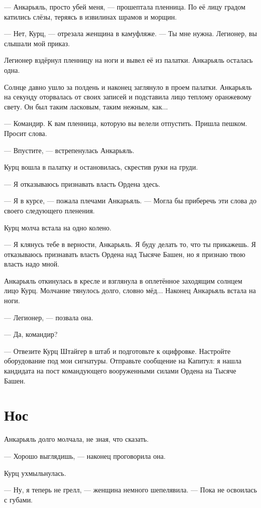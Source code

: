 \documentclass[a4paper,10pt,fleqn]{book}\usepackage{polyglossia}\setdefaultlanguage{english}\setotherlanguage{russian}\defaultfontfeatures{Ligatures=TeX,Mapping=tex-text}\usepackage{xcolor}\definecolor{lightgray}{HTML}{bbbbbb}\color{lightgray}\newcommand{\ml}[3]{\textcolor{black}{#3}}
\begin{document}
--- Анкарьяль, просто убей меня, --- прошептала пленница.
По её лицу градом катились слёзы, теряясь в извилинах шрамов и морщин.

--- Нет, Курц, --- отрезала женщина в камуфляже.
--- Ты мне нужна.
Легионер, вы слышали мой приказ.

Легионер вздёрнул пленницу на ноги и вывел её из палатки.
Анкарьяль осталась одна.

Солнце давно ушло за полдень и наконец заглянуло в проем палатки.
Анкарьяль на секунду оторвалась от своих записей и подставила лицо теплому оранжевому свету.
Он был таким ласковым, таким нежным, как...

--- Командир.
К вам пленница, которую вы велели отпустить.
Пришла пешком.
Просит слова.

--- Впустите, --- встрепенулась Анкарьяль.

Курц вошла в палатку и остановилась, скрестив руки на груди.

--- Я отказываюсь признавать власть Ордена здесь.

--- Я в курсе, --- пожала плечами Анкарьяль.
--- Могла бы приберечь эти слова до своего следующего пленения.

Курц молча встала на одно колено.

--- Я клянусь тебе в верности, Анкарьяль.
Я буду делать то, что ты прикажешь.
Я отказываюсь признавать власть Ордена над Тысяче Башен, но я признаю твою власть надо мной.

Анкарьяль откинулась в кресле и взглянула в оплетённое заходящим солнцем лицо Курц.
Молчание тянулось долго, словно мёд...
Наконец Анкарьяль встала на ноги.

--- Легионер, --- позвала она.

--- Да, командир?

--- Отвезите Курц Штайгер в штаб и подготовьте к оцифровке.
Настройте оборудование под мои сигнатуры.
Отправьте сообщение на Капитул: я нашла кандидата на пост командующего вооруженными силами Ордена на Тысяче Башен.

\section{Нос}

Анкарьяль долго молчала, не зная, что сказать.

--- Хорошо выглядишь, --- наконец проговорила она.

Курц ухмыльнулась.

--- Ну, я теперь не грелл, --- женщина немного шепелявила.
--- Пока не освоилась с губами.
\end{document}

